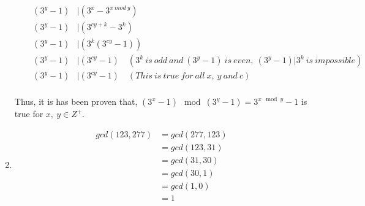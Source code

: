 \documentclass[12pt]{article}
\begin{document}
\begin{enumerate}
\begin{enumerate}
\begin{equation}
            \begin{split}
                (3^y - 1) & | (3^x - 3^{x\ mod \ y})\\
                (3^y - 1) & | (3^{cy + k} - 3^k)\\
                (3^y - 1) & | (3^k(3^{cy} - 1)) \\
                (3^y - 1) & | (3^{cy} - 1) \quad (3^k \ is \ odd \ and \ (3^y - 1) \ is \ even, \ (3^y - 1)|3^k \ is \ impossible) \\
                (3^y - 1) & | (3^{cy} - 1) \quad (This \ is \ true \ for \ all \ x, \ y \ and \ c) \\
            \end{split}
        \end{equation}
    \end{enumerate}
    Thus, it is has been proven that, $(3^x - 1) \mod (3^y - 1) = 3^{x \mod y} - 1$ is true for $x, \ y \in Z^+$.
    
    \item
    \begin{equation}
        \begin{split}
            gcd(123, 277) & = gcd(277, 123)\\
            & = gcd(123, 31)\\
            & = gcd(31, 30)\\
            & = gcd(30, 1)\\
            & = gcd(1, 0)\\
            & = 1
        \end{split}
    \end{equation}
\end{enumerate}
\end{document}
